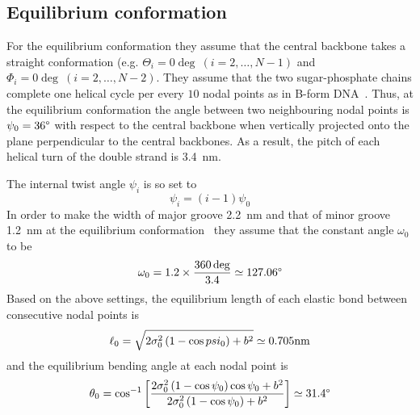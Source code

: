 \documentclass[a4paper,10pt]{article}
\begin{document}
\subsection{Equilibrium conformation}
For the equilibrium conformation they assume that the central backbone takes a straight conformation (e.g. $\Theta_i=0\deg\ (i=2,\dots,N-1)$ and $\Phi_i=0\deg\ (i=2,\dots,N-2)$.
They assume that the two sugar-phosphate chains complete one helical cycle per every $10$ nodal points as in B-form DNA~\cite{1, 2}.
Thus, at the equilibrium conformation the angle between two neighbouring nodal points is $\psi_0=36\degree$ with respect to the central backbone when vertically projected onto the plane perpendicular to the central backbones.
As a result, the pitch of each helical turn of the double strand is \SI{3.4}{\nm}.

The internal twist angle $\psi_i$ is so set to
\begin{equation}
\psi_i=\left(i-1\right) \psi_0
\end{equation}
In order to make the width of major groove \SI{2.2}{\nm} and that of minor groove \SI{1.2}{\nm} at the equilibrium conformation~\cite{1, 2} they assume that the constant angle $\omega_0$ to be
\begin{equation}
\omega_0=1.2\times\dfrac{360\deg}{3.4}\simeq127.06\degree
\end{equation}
Based on the above settings, the equilibrium length of each elastic bond between consecutive nodal points is
\begin{equation}\label{eq:l_0}
\ell_0=\sqrt{2\sigma_0^2\left(1-\cos\\psi_0\right)+b^2}\simeq0.705\text{nm}
\end{equation}
and the equilibrium bending angle at each nodal point is
\begin{equation}\label{eq:theta_0}
\theta_0=\cos^{-1}\left[\dfrac{2\sigma_0^2\left(1-\cos\psi_0\right)\cos\psi_0+b^2}{2\sigma_0^2\left(1-\cos\psi_0\right)+b^2}\right]\simeq31.4\degree
\end{equation}
\end{document}
